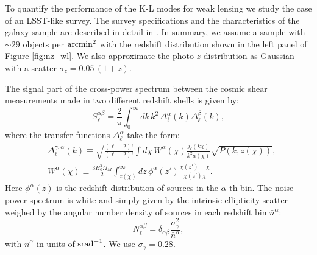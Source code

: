 \documentclass[twocolumn,amsfont,amssymb,amsmath, showpacs,balancelastpage, nofootinbib]{revtex4-1}
\begin{document}
    To quantify the performance of the K-L modes for weak lensing we study the case of an LSST-like survey. The survey specifications and the characteristics of the galaxy sample are described in detail in \cite{2015ApJ...814..145A}. In summary, we assume a sample with $\sim29$ objects per ${\rm arcmin}^2$ with the redshift distribution shown in the left panel of Figure \ref{fig:nz_wl}. We also approximate the photo-$z$ distribution as Gaussian with a scatter $\sigma_z=0.05\,(1+z)$.    
    
    The signal part of the cross-power spectrum between the cosmic shear measurements made in two different redshift shells is given by:
    \begin{equation}\label{eq:cl_generic}
      S^{\alpha\beta}_\ell=\frac{2}{\pi}\int_0^\infty dk\,k^2\,\Delta^\alpha_\ell(k)\Delta^\beta_\ell(k),
    \end{equation}
    where the transfer functions $\Delta^{\alpha}_\ell$ take the form:
    \begin{align}\nonumber
      &\Delta^{\gamma,\alpha}_\ell(k)\equiv\sqrt{\frac{(\ell+2)!}{(\ell-2)!}}\int d\chi\,W^\alpha(\chi)\frac{j_\ell(k\chi)}{k^2a(\chi)}\sqrt{P(k,z(\chi))},\\%
      &W^\alpha(\chi)\equiv\frac{3H_0^2\Omega_M}{2}\int_{z(\chi)}^\infty dz\,\phi^\alpha(z')\frac{\chi(z')-\chi}{\chi(z')\chi}.
    \end{align}
    Here $\phi^\alpha(z)$ is the redshift distribution of sources in the $\alpha$-th bin. The noise power spectrum is white and simply given by the intrinsic ellipticity scatter weighed by the angular number density of sources in each redshift bin $\bar{n}^\alpha$:
    \begin{equation}
      N^{\alpha\beta}_\ell=\delta_{\alpha\beta}\frac{\sigma_\gamma^2}{\bar{n}^\alpha},
    \end{equation}
    with $\bar{n}^\alpha$ in units of ${\rm srad}^{-1}$. We use $\sigma_\gamma=0.28$.
    
\end{document}
